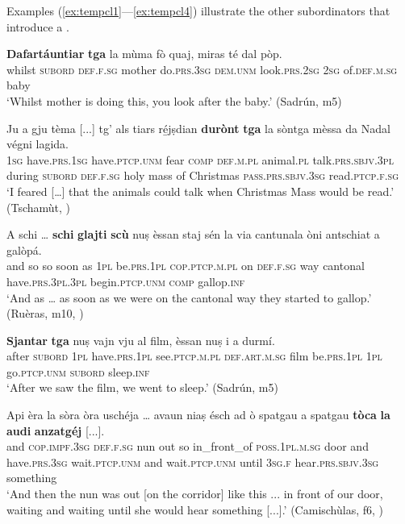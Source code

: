 Examples (\ref{ex:tempcl1}—\ref{ex:tempcl4}) illustrate the other subordinators that introduce a .

\ea
\label{ex:tempcl1}
\gll \textbf{Dafartáuntiar} \textbf{tga} la mùma fò quaj, miras té dal pòp.\\
whilst \textsc{subord} \textsc{def.f.sg} mother do.\textsc{prs.3sg} \textsc{dem.unm} look.\textsc{prs.2sg} \textsc{2sg} of.\textsc{def.m.sg} baby\\
\glt `Whilst mother is doing this, you look after the baby.' (Sadrún, m5)
\z

\ea
\label{ex:tempcl2}
\gll Ju a gju tèma [...] tg' als tiars ré̱jṣdian \textbf{durònt} \textbf{tga} la sòntga mèssa da Nadal végni lagida.\\
      \textsc{1sg} have.\textsc{prs.1sg} have.\textsc{ptcp.unm} fear {} \textsc{comp} \textsc{def.m.pl} animal.\textsc{pl} talk.\textsc{prs.sbjv.3pl} during \textsc{subord} \textsc{def.f.sg} holy mass of Christmas \textsc{pass.prs.sbjv.3sg} read.\textsc{ptcp.f.sg}\\
\glt `I feared […] that the animals could talk when Christmas Mass would be read.' (Tschamùt, \citealt[19]{Büchli1966})
\z

\ea
\label{ex:tempcl3}
\gll  A schi … \textbf{schi} \textbf{glajti} \textbf{scù} nuṣ èssan staj sén la via cantunala òni antschiat a galòpá.  \\
and so {} so soon as \textsc{1pl} be.\textsc{prs.1pl} \textsc{cop.ptcp.m.pl} on \textsc{def.f.sg} way cantonal have.\textsc{prs.3pl.3pl} begin.\textsc{ptcp.unm} \textsc{comp} gallop.\textsc{inf}\\
\glt `And as … as soon as we were on the cantonal way they started to gallop.' (Ruèras, m10, )
\z

\ea
\label{ex:sjantarf1}
\gll \textbf{Sjantar} \textbf{tga} nuṣ vajn vju al film, èssan nuṣ i a durmí.\\
after \textsc{subord} \textsc{1pl} have.\textsc{prs.1pl} see.\textsc{ptcp.m.pl} \textsc{def.art.m.sg} film be.\textsc{prs.1pl} \textsc{1pl} go.\textsc{ptcp.unm} \textsc{subord} sleep.\textsc{inf}\\
\glt `After we saw the film, we went to sleep.' (Sadrún, m5)
\z

\ea
\label{ex:tempcl4}
\gll    Api èra la sòra òra uschéja … avaun niaṣ ésch ad ò spatgau a spatgau \textbf{tòca} \textbf{la} \textbf{audi} \textbf{anzatgéj} [...].\\
and \textsc{cop.impf.3sg} \textsc{def.f.sg} nun out so {} in\_front\_of \textsc{poss.1pl.m.sg} door and have.\textsc{prs.3sg} wait.\textsc{ptcp.unm} and wait.\textsc{ptcp.unm} until \textsc{3sg.f} hear.\textsc{prs.sbjv.3sg} something\\
\glt `And then the nun was out [on the corridor] like this ... in front of our door, waiting and waiting until she would hear something [...].' (Camischùlas, f6, )
\z


